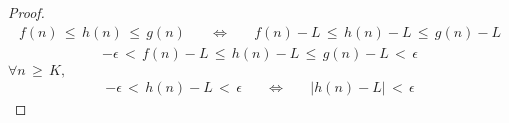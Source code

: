 \begin{theorem}
\begin{proof}
\begin{align*}
        f(n) \hspace{2pt} \leq \hspace{2pt} h(n) \hspace{2pt} \leq \hspace{2pt} g(n) \hspace{20pt} \Longleftrightarrow \hspace{20pt} f(n) - L \hspace{2pt} \leq \hspace{2pt} h(n) - L \hspace{2pt} \leq \hspace{2pt} g(n) - L
    \end{align*}
    \begin{align*}
        -\epsilon \hspace{2pt} < \hspace{2pt} f(n) - L \hspace{2pt} \leq \hspace{2pt} h(n) - L \hspace{2pt} \leq \hspace{2pt} g(n) - L \hspace{2pt} < \hspace{2pt} \epsilon
    \end{align*}
     $\forall n \hspace{2pt} \geq \hspace{2pt} K,$ 
    \begin{align*}
        -\epsilon \hspace{2pt} < \hspace{2pt} h(n) - L \hspace{2pt} < \hspace{2pt} \epsilon \hspace{20pt} \Longleftrightarrow \hspace{20pt} \lvert h(n) - L \rvert \hspace{2pt} < \hspace{2pt} \epsilon
    \end{align*}
\end{proof}
\end{theorem}

